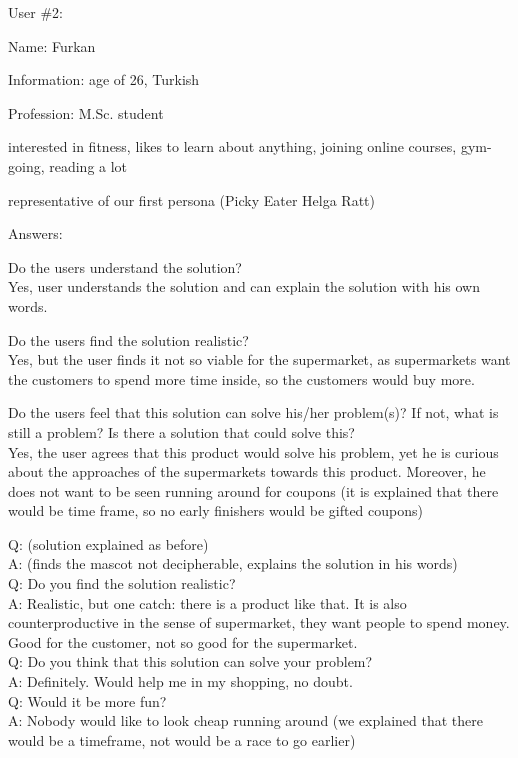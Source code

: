 \documentclass[a4paper,10pt,oneside]{scrreprt}
\begin{document}
\bigskip
\bigskip

User \#2:
\begin{compactitem}
	\item Name: Furkan
	\item Information: age of 26, Turkish
	\item Profession: M.Sc. student
	\item interested in fitness, likes to learn about anything, joining online courses, gym-going, reading a lot
	\item representative of our first persona (Picky Eater Helga Ratt)
\end{compactitem}
\bigskip

Answers:
\begin{compactitem}
	\item Do the users understand the solution?\\
	Yes, user understands the solution and can explain the solution with his own words.
	\\
	
	
	\item Do the users find the solution realistic?\\
	Yes, but the user finds it not so viable for the supermarket, as supermarkets want the customers to spend more time inside, so the customers would buy more.
	\\
	
	\item Do the users feel that this solution can solve his/her problem(s)? If not, what is still
	a problem? Is there a solution that could solve this?\\
	Yes, the user agrees that this product would solve his problem, yet he is curious about the approaches of the supermarkets towards this product. Moreover, he does not want to be seen running around for coupons (it is explained that there would be time frame, so no early finishers would be gifted coupons)
	\\
\end{compactitem}
\bigskip

\noindent Q: (solution explained as before) \\
A: (finds the mascot not decipherable, explains the solution in his words) \\
Q: Do you find the solution realistic?\\
A: Realistic, but one catch: there is a product like that. It is also counterproductive in the sense of supermarket, they want people to spend money. Good for the customer, not so good for the supermarket.\\
Q: Do you think that this solution can solve your problem?\\
A: Definitely. Would help me in my shopping, no doubt.\\
Q: Would it be more fun? \\
A: Nobody would like to look cheap running around (we explained that there would be a timeframe, not would be a race to go earlier)\\
\end{document}
